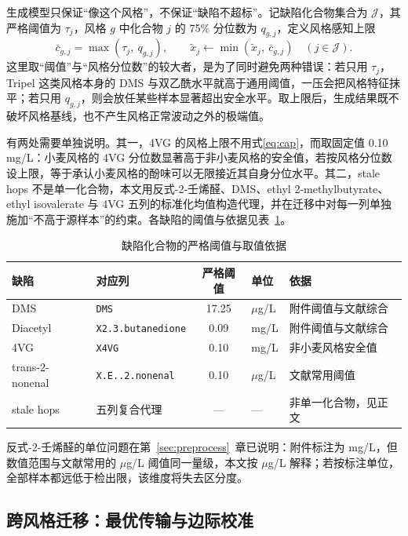 ﻿\documentclass[UTF8,a4paper,zihao=-4]{ctexart}
\numberwithin{figure}{section}
\numberwithin{table}{section}
\numberwithin{equation}{section}
\newcommand{\file}[1]{\texttt{#1}}
\begin{document}
生成模型只保证“像这个风格”，不保证“缺陷不超标”。记缺陷化合物集合为 $\mathcal{J}$，其严格阈值为 $\tau_j$，风格 $g$ 中化合物 $j$ 的 75\% 分位数为 $q_{g,j}$，定义风格感知上限
\begin{equation}
\bar{c}_{g,j}=\max\left(\tau_j,\ q_{g,j}\right),\qquad
\tilde{x}_j\leftarrow\min\left(\tilde{x}_j,\ \bar{c}_{g,j}\right)\quad (j\in\mathcal{J}).
\label{eq:cap}
\end{equation}
这里取“阈值”与“风格分位数”的较大者，是为了同时避免两种错误：若只用 $\tau_j$，Tripel 这类风格本身的 DMS 与双乙酰水平就高于通用阈值，一压会把风格特征抹平；若只用 $q_{g,j}$，则会放任某些样本显著超出安全水平。取上限后，生成结果既不破坏风格基线，也不产生风格正常波动之外的极端值。

有两处需要单独说明。其一，4VG 的风格上限不用式\eqref{eq:cap}，而取固定值 0.10 mg/L：小麦风格的 4VG 分位数显著高于非小麦风格的安全值，若按风格分位数设上限，等于承认小麦风格的酚味可以无限接近其自身分位水平。其二，stale hops 不是单一化合物，本文用反式-2-壬烯醛、DMS、ethyl 2-methylbutyrate、ethyl isovalerate 与 4VG 五列的标准化均值构造代理，并在迁移中对每一列单独施加“不高于源样本”的约束。各缺陷的阈值与依据见表~\ref{tab:q3-thr}。

\begin{table}[H]
  \centering
  \caption{缺陷化合物的严格阈值与取值依据}
  \label{tab:q3-thr}
  \small
  \begin{tabularx}{\textwidth}{@{}l l c l >{\raggedright\arraybackslash}X@{}}
    \toprule
    缺陷 & 对应列 & 严格阈值 & 单位 & 依据 \\
    \midrule
    DMS & \file{DMS} & 17.25 & $\mu$g/L & 附件阈值与文献综合 \\
    Diacetyl & \file{X2.3.butanedione} & 0.09 & mg/L & 附件阈值与文献综合 \\
    4VG & \file{X4VG} & 0.10 & mg/L & 非小麦风格安全值 \\
    trans-2-nonenal & \file{X.E..2.nonenal} & 0.10 & $\mu$g/L & 文献常用阈值 \\
    stale hops & 五列复合代理 & — & — & 非单一化合物，见正文 \\
    \bottomrule
  \end{tabularx}
\end{table}

反式-2-壬烯醛的单位问题在第~\ref{sec:preprocess}~章已说明：附件标注为 mg/L，但数值范围与文献常用的 $\mu$g/L 阈值同一量级，本文按 $\mu$g/L 解释；若按标注单位，全部样本都远低于检出限，该维度将失去区分度。

\subsection{跨风格迁移：最优传输与边际校准}
\end{document}
